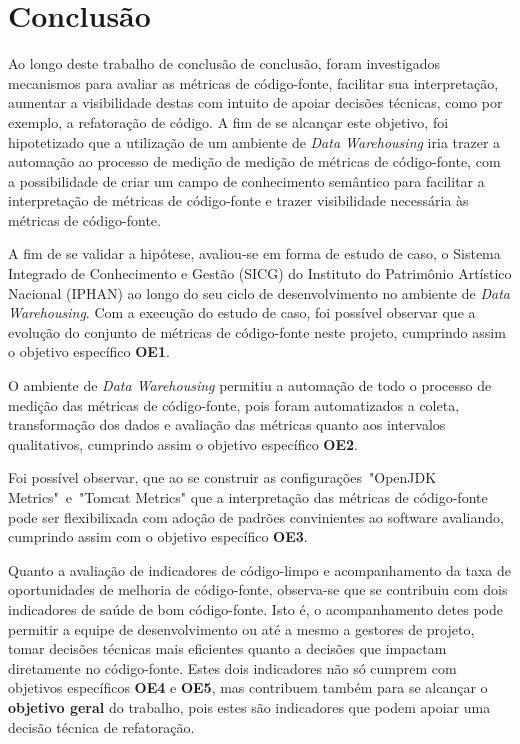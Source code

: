 \chapter{Conclusão}


Ao longo deste trabalho de conclusão de conclusão, foram investigados mecanismos para avaliar as métricas de código-fonte, facilitar sua interpretação, aumentar a visibilidade destas com intuito de apoiar decisões técnicas, como por exemplo, a refatoração de código. A fim de se alcançar este objetivo, foi hipotetizado que a utilização de um ambiente de \textit{Data Warehousing} iria trazer a automação ao processo de medição de medição de métricas de código-fonte, com a possibilidade de criar um campo de conhecimento semântico para facilitar a interpretação de métricas de código-fonte e trazer visibilidade necessária às métricas de código-fonte.


A fim de se validar a hipótese, avaliou-se em forma de estudo de caso, o Sistema Integrado de Conhecimento e Gestão (SICG) do Instituto do Patrimônio Artístico Nacional (IPHAN) ao longo do seu ciclo de desenvolvimento no ambiente de \textit{Data Warehousing}. Com a execução do estudo de caso, foi possível observar que a evolução do conjunto de métricas de código-fonte neste projeto, cumprindo assim o objetivo específico \textbf{OE1}.

O ambiente de \textit{Data Warehousing} permitiu a automação de todo o processo de medição das métricas de código-fonte, pois foram automatizados a coleta, transformação dos dados e avaliação das métricas quanto aos intervalos qualitativos, cumprindo assim o objetivo específico \textbf{OE2}.

Foi possível observar, que ao se construir as configurações~"OpenJDK Metrics"~e~"Tomcat Metrics" que a interpretação das métricas de código-fonte pode ser flexibilixada com adoção de padrões convinientes ao software avaliando, cumprindo assim com o objetivo específico \textbf{OE3}.

Quanto a avaliação de indicadores de código-limpo e acompanhamento da taxa de oportunidades de melhoria de código-fonte, observa-se que se contribuiu com dois indicadores de saúde de bom código-fonte. Isto é, o acompanhamento detes pode permitir a equipe de desenvolvimento ou até a mesmo a gestores de projeto, tomar decisões técnicas mais eficientes quanto a decisões que impactam diretamente no código-fonte. Estes dois indicadores não só cumprem com objetivos específicos \textbf{OE4} e \textbf{OE5}, mas contribuem também para se alcançar o \textbf{objetivo geral} do trabalho, pois estes são indicadores que podem apoiar uma decisão técnica de refatoração.

